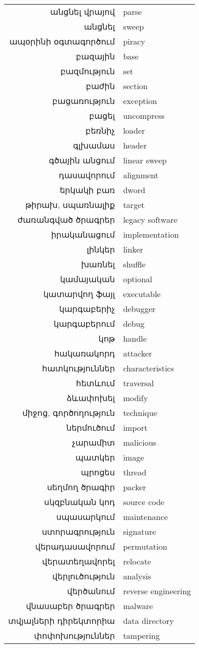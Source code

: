 \documentclass[12pt]{article}
\begin{document}
\begin{sloppypar}
\begin{tabular}{rl}
անցնել վրայով&parse \\
անցնել&sweep \\
ապօրինի օգտագործում&piracy \\
բազային&base \\
բազմություն&set \\
բաժին&section \\
բացառություն&exception \\
բացել&uncompress \\
բեռնիչ&loader \\
գլխամաս&header \\
գծային անցում&linear sweep \\
դասավորում&alignment \\
երկակի բառ&dword \\
թիրախ, սպառնալիք&target \\
ժառանգված ծրագրեր&legacy software \\
իրականացում&implementation \\
լինկեր&linker \\
խառնել&shuffle \\
կամայական&optional \\
կատարվող ֆայլ&executable \\
կարգաբերիչ&debugger \\
կարգաբերում&debug \\
կոթ&handle \\
հակառակորդ&attacker \\
հատկություններ&characteristics \\
հետևում&traversal \\
ձևափոխել&modify \\
միջոց, գործողություն&technique \\
ներմուծում&import \\
չարամիտ&malicious \\
պատկեր&image \\
պրոցես&thread \\
սեղմող ծրագիր&packer \\
սկզբնական կոդ&source code \\
սպասարկում&maintenance \\
ստորագրություն&signature \\
վերադասավորում&permutation \\
վերատեղավորել&relocate \\
վերլուծություն&analysis \\
վերծանում&reverse engineering \\
վնասաբեր ծրագրեր&malware \\
տվյալների դիրեկտորիա&data directory \\
փոփոխություններ&tampering \\
\end{tabular}


\end{sloppypar}
\end{document}
